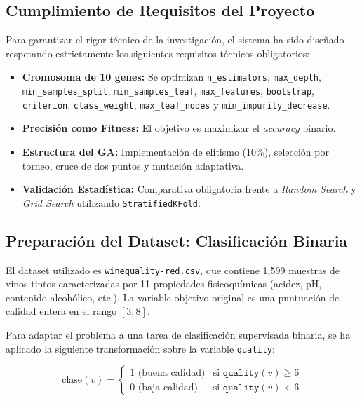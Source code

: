 \documentclass[12pt, a4paper]{article}
\begin{document}
\subsection{Cumplimiento de Requisitos del Proyecto}

Para garantizar el rigor técnico de la investigación, el sistema ha sido diseñado
respetando estrictamente los siguientes requisitos técnicos obligatorios:

\begin{itemize}[itemsep=0.2em]
  \item \textbf{Cromosoma de 10 genes:} Se optimizan \texttt{n\_estimators}, \texttt{max\_depth},
        \texttt{min\_samples\_split}, \texttt{min\_samples\_leaf}, \texttt{max\_features},
        \texttt{bootstrap}, \texttt{criterion}, \texttt{class\_weight}, \texttt{max\_leaf\_nodes}
        y \texttt{min\_impurity\_decrease}.
  \item \textbf{Precisión como Fitness:} El objetivo es maximizar el \textit{accuracy} binario.
  \item \textbf{Estructura del GA:} Implementación de elitismo (10\%), selección por torneo,
        cruce de dos puntos y mutación adaptativa.
  \item \textbf{Validación Estadística:} Comparativa obligatoria frente a \textit{Random Search}
        y \textit{Grid Search} utilizando \texttt{StratifiedKFold}.
\end{itemize}

\subsection{Preparación del Dataset: Clasificación Binaria}

El dataset utilizado es \texttt{winequality-red.csv}, que contiene 1{,}599 muestras de
vinos tintos caracterizadas por 11 propiedades fisicoquímicas (acidez, pH, contenido
alcohólico, etc.). La variable objetivo original es una puntuación de calidad entera en
el rango $[3, 8]$.

Para adaptar el problema a una tarea de clasificación supervisada binaria, se ha aplicado
la siguiente transformación sobre la variable \texttt{quality}:

\begin{equation}
  \text{clase}(v) =
  \begin{cases}
    1 \text{ (buena calidad)} & \text{si } \texttt{quality}(v) \geq 6 \\
    0 \text{ (baja calidad)}  & \text{si } \texttt{quality}(v) < 6
  \end{cases}
\end{equation}
\end{document}
